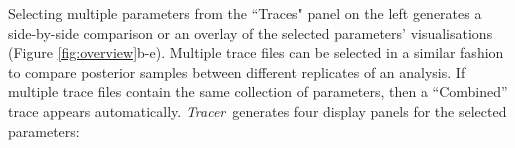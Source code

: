 \documentclass[webpdf,mynatbib,nosurname,nogrid,noCE,noMSC]{SYS}
\newcommand{\tracer}{\emph{Tracer}}
\begin{document}

Selecting multiple parameters from the ``Traces" panel on the left generates a side-by-side comparison or an overlay of the selected parameters' visualisations (Figure \ref{fig:overview}b-e).
Multiple trace files can be selected in a similar fashion to compare posterior samples between different replicates of an analysis.
If multiple trace files contain the same collection of parameters,  then a ``Combined'' trace appears automatically. %
\tracer\ generates four display panels for the selected parameters:
\end{document}
